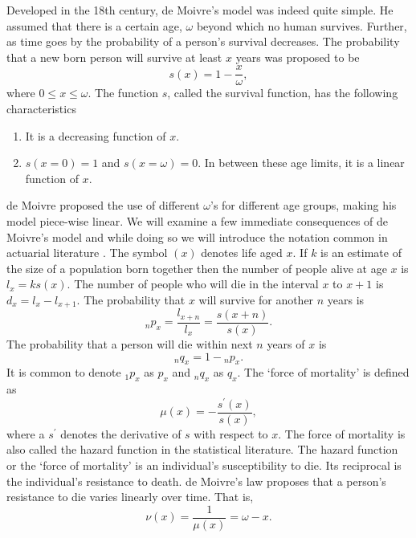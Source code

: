 \documentclass{article}
\numberwithin{equation}{section}
\begin{document}
Developed in the 18th century, de Moivre's model was indeed quite simple. 
He assumed that there is a certain age, $\omega$ beyond which no human 
survives. Further, as time goes by the probability of a person's survival
decreases. The probability that a new born person will survive at least
$x$ years was proposed to be
\begin{equation}\label{s1e1}
s(x) = 1 - \frac{x}{\omega}, 
\end{equation}
where $0 \le x \le \omega$. The function $s$, called the survival function,
has the following characteristics
\begin{enumerate}
\item It is a decreasing function of $x$.
\item $s(x = 0) = 1$ and $s(x = \omega) = 0$. In between these age limits, it
is a linear function of $x$.
\end{enumerate}
de Moivre proposed the use of different $\omega$'s for different age groups, 
making his model piece-wise linear. We will examine a few immediate 
consequences of de Moivre's model and while doing so we will introduce the
notation common in actuarial literature \cite{jordan1967society}. The symbol
$(x)$ denotes life aged $x$. If $k$ is an estimate of the size of a population
born together then the number of people alive at age $x$ is $l_x = ks(x)$.
The number of people who will die in the interval $x$ to $x + 1$ is $d_x = l_x
- l_{x+1}$. The probability that $x$ will survive for another $n$ years is
\begin{equation}\label{s1e2}
{}_np_x = \frac{l_{x+n}}{l_x} = \frac{s(x+n)}{s(x)}.
\end{equation}
The probability that a person will die within next $n$ years of $x$ is
\begin{equation}\label{s1e3}
{}_nq_x = 1 - {}_np_x.
\end{equation}
It is common to denote ${}_1p_x$ as $p_x$ and ${}_nq_x$ as $q_x$. The `force
of mortality' is defined as
\begin{equation}\label{s1e4}
\mu(x) = -\frac{s^\prime(x)}{s(x)}, 
\end{equation}
where a $s^\prime$ denotes the derivative of $s$ with respect to $x$. The 
force of mortality is also called the hazard function in the statistical
literature. The hazard function or the `force of mortality' is an individual's
susceptibility to die. Its reciprocal is the individual's resistance to death. 
de Moivre's law proposes that a person's resistance to die varies linearly over
time. That is,
\begin{equation}\label{s1e5}
\nu(x) = \frac{1}{\mu(x)} = \omega - x.
\end{equation}
\end{document}
